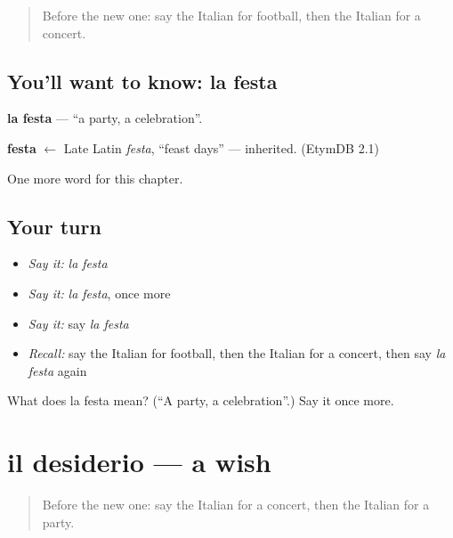 \label{lesson:IT-C117-festa}



\begin{quote}
Before the new one: say the Italian for football, then the Italian for a concert.
\end{quote}

\subsection*{You'll want to know: la festa}
\textbf{la festa} — \textquotedblleft{}a party, a celebration\textquotedblright{}.

\begin{cousinweb}
\textbf{festa} $\leftarrow$ Late Latin \emph{festa}, \textquotedblleft{}feast days\textquotedblright{} — inherited. (EtymDB 2.1)
\end{cousinweb}

\begin{grammarlens}[title={What you've built}]
One more word for this chapter.
\end{grammarlens}

\subsection*{Your turn}
\begin{itemize}
\raggedright
  \item \emph{Say it:} \emph{la festa}
  \item \emph{Say it:} \emph{la festa}, once more
  \item \emph{Say it:} say \emph{la festa}
  \item \emph{Recall:} say the Italian for football, then the Italian for a concert, then say \emph{la festa} again
\end{itemize}

\begin{tcolorbox}[breakable,colback=teal!4,colframe=teal!35!black,title={Before you move on}]
What does la festa mean? (\textquotedblleft{}A party, a celebration\textquotedblright{}.) Say it once more.
\end{tcolorbox}
\section[il desiderio]{il desiderio — a wish}

\label{lesson:IT-C117-desiderio}



\begin{quote}
Before the new one: say the Italian for a concert, then the Italian for a party.
\end{quote}

